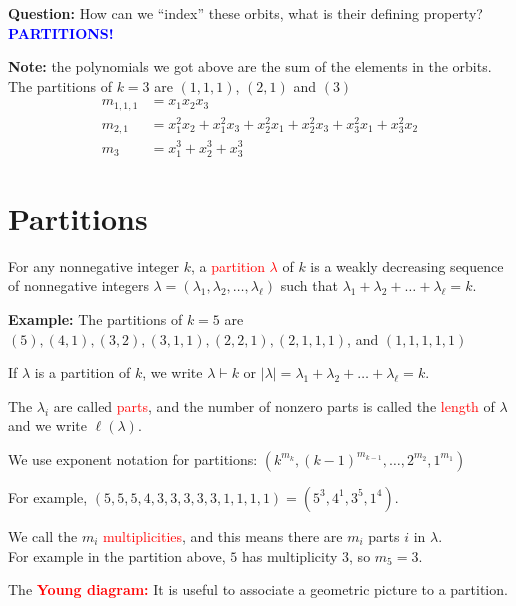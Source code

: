 \documentclass[12pt]{memoir}
\begin{document}
\textbf{Question:} How can we ``index'' these orbits, what is their defining property? \textcolor{blue}{\textbf{PARTITIONS!}}

\textbf{Note:} the polynomials we got above are the sum of the elements in the orbits. The partitions of $k = 3$ are $(1,1,1)$, $(2,1)$ and $(3)$
\begin{align*}
    m_{1,1,1} &= x_1 x_2 x_3\\
    m_{2,1} &= x_1^2 x_2 + x_1^2 x_3 + x_2^2 x_1 + x_2^2 x_3 + x_3^2 x_1 + x_3^2 x_2\\
    m_3 &= x_1^3 + x_2^3 + x_3^3
\end{align*}

\newpage

\section{Partitions}

\begin{ptcb}
\begin{Def}
For any nonnegative integer $k$, a \textcolor{red}{partition $\lambda$} of $k$ is a weakly decreasing sequence of nonnegative integers $\lambda = (\lambda_1, \lambda_2, \dots, \lambda_\ell)$ such that $\lambda_1 + \lambda_2 + \dots + \lambda_\ell = k$.
\end{Def}
\end{ptcb}

\textbf{Example:} The partitions of $k = 5$ are $(5), (4,1), (3,2), (3,1,1), (2,2,1), (2,1,1,1)$, and $(1,1,1,1,1)$

If $\lambda$ is a partition of $k$, we write $\lambda \vdash k$ or $|\lambda| = \lambda_1 + \lambda_2 + \dots + \lambda_\ell = k$.

The $\lambda_i$ are called \textcolor{red}{parts}, and the number of nonzero parts is called the \textcolor{red}{length} of $\lambda$ and we write $\ell(\lambda)$.

We use exponent notation for partitions: $(k^{m_k}, (k-1)^{m_{k-1}}, \dots, 2^{m_2}, 1^{m_1})$

For example, $(5,5,5,4,3,3,3,3,3,1,1,1,1) = (5^3, 4^1, 3^5, 1^4)$.

We call the $m_i$ \textcolor{red}{multiplicities}, and this means there are $m_i$ parts $i$ in $\lambda$.\\
For example in the partition above, $5$ has multiplicity $3$, so $m_5 = 3$.

The \textcolor{red}{\textbf{Young diagram:}} It is useful to associate a geometric picture to a partition.
\end{document}

